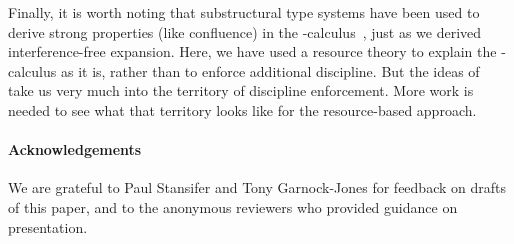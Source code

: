 \documentclass{entcs}
\begin{document}
Finally, it is worth noting that substructural type systems have been
used to derive strong properties (like confluence) in the
-calculus~\cite{Kobayashi1999}, just as we derived
interference-free expansion.  Here, we have used a resource theory to
explain the -calculus as it is, rather than to enforce additional
discipline.  But the ideas of~ take us very much
into the territory of discipline enforcement.  More work is needed to
see what that territory looks like for the resource-based approach.

\paragraph{Acknowledgements}  We are grateful to Paul Stansifer and 
Tony Garnock-Jones for feedback on drafts of this paper, and to the
anonymous reviewers who provided guidance on presentation.

{} 
\end{document}
